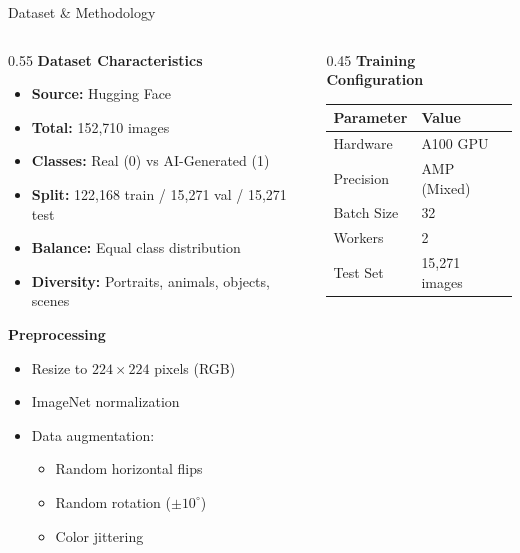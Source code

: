 \documentclass[aspectratio=169]{beamer}
\begin{document}
\begin{frame}{Dataset \& Methodology}
    \begin{columns}[T]
        \begin{column}{0.55\textwidth}
            \textbf{Dataset Characteristics}
            \begin{itemize}
                \item \textbf{Source:} Hugging Face
                \item \textbf{Total:} 152,710 images
                \item \textbf{Classes:} Real (0) vs AI-Generated (1)
                \item \textbf{Split:} 122,168 train / 15,271 val / 15,271 test
                \item \textbf{Balance:} Equal class distribution
                \item \textbf{Diversity:} Portraits, animals, objects, scenes
            \end{itemize}
            
            \vspace{0.1cm}
            \textbf{Preprocessing}
            \begin{itemize}
                \item Resize to $224 \times 224$ pixels (RGB)
                \item ImageNet normalization
                \item Data augmentation:
                    \begin{itemize}
                        \scriptsize
                        \item Random horizontal flips
                        \item Random rotation ($\pm 10^\circ$)
                        \item Color jittering
                    \end{itemize}
            \end{itemize}
        \end{column}
        
        \begin{column}{0.45\textwidth}
            \textbf{Training Configuration}
            \begin{table}[h]
                \scriptsize
                \begin{tabular}{ll}
                    \toprule
                    \textbf{Parameter} & \textbf{Value} \\
                    \midrule
                    Hardware & A100 GPU \\
                    Precision & AMP (Mixed) \\
                    Batch Size & 32 \\
                    Workers & 2 \\
                    Test Set & 15,271 images \\
                    \bottomrule
                \end{tabular}
            \end{table}
            

\end{column}
\end{columns}
\end{frame}
\end{document}
